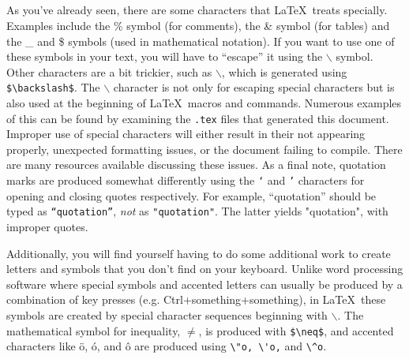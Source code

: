 \subsection{}

As you've already seen, there are some characters that \LaTeX ~treats 
specially. Examples include the \% symbol (for comments), the \& symbol
(for tables) and the \_ and \$ symbols (used in mathematical notation).
If you want to use one of these symbols in your text, you will have to
``escape'' it using the $\backslash$ symbol. Other characters are a bit 
trickier, such as $\backslash$, which is generated using \verb+$\backslash$+.
The $\backslash$ character is not only for escaping special characters but
is also used at the beginning of \LaTeX ~macros and commands. Numerous examples
of this can be found by examining the {\tt .tex} files that generated this
document.
Improper use of special characters will either result in their not appearing
properly, unexpected formatting issues, or the document failing to compile.
There are many resources available discussing these issues. As a final note,
quotation marks are produced somewhat differently using the {\tt `} and {\tt '}
characters for opening and closing quotes respectively. For example, 
``quotation'' should be typed as {\tt ``quotation''}, {\it not} as 
{\tt "quotation"}. The latter yields "quotation", with improper quotes.

Additionally, you will find yourself having to do some additional work to
create letters and symbols that you don't find on your keyboard. Unlike
word processing software where special symbols and accented letters can usually
be produced by a combination of key presses (e.g. Ctrl+something+something),
in \LaTeX ~these symbols are created by special character sequences beginning
with $\backslash$. The mathematical symbol for inequality, $\neq$, is produced
with \verb+$\neq$+, and accented characters like \"o, \'o, and \^o are produced
using \verb+\"o, \'o,+ and \verb+\^o+.

\subsection{}

